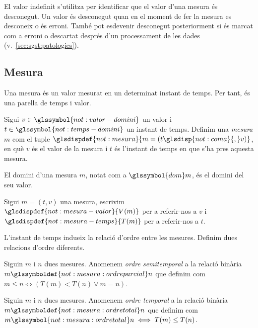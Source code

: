 El valor indefinit s'utilitza per identificar que el valor d'una
mesura és desconegut. Un valor és desconegut quan en el moment de fer
la mesura es desconeix o és erroni. També pot esdevenir desconegut
posteriorment si és marcat com a erroni o descartat després d'un
processament de les dades (v.~\autoref{sec:sgst:patologies}).





\subsection{Mesura}\label{sec:model:mesura} 

Una mesura és un valor mesurat en un determinat instant de temps. Per tant, 
és una parella de temps i valor.

\begin{definition}[Mesura]
  \label{def:model:mesura}
  Sigui $v\in\glssymbol{not:valor-domini}$ un valor i
  $t\in\glssymbol{not:temps-domini}$ un instant de temps. Definim una
  \emph{mesura} $m$ com el tuple
  $\glsdispdef{not:mesura}{m=(t\glsdisp{not:coma}{,}v)}$, en què $v$
  és el valor de la mesura i $t$ és l'instant de temps en que s'ha
  pres aquesta mesura.

  El domini d'una mesura $m$, notat com a
  $\glssymbol{dom}m$, és el domini del seu valor.
\end{definition}


Sigui $m=(t,v)$ una mesura, escrivim
$\glsdispdef{not:mesura-valor}{V(m)}$ per a referir-nos a $v$ i
$\glsdispdef{not:mesura-temps}{T(m)}$ per a referir-nos a $t$.


L'instant de temps indueix la relació d'ordre
entre les mesures. Definim dues relacions d'ordre diferents.

\begin{definition}
  Siguin $m$ i $n$ dues mesures. Anomenem \emph{ordre semitemporal} a
  la relació binària $m\glssymboldef{not:mesura:ordreparcial} n$ que
  definim com $m\leq n \iff (T(m) < T(n) \vee m=n)$.
\end{definition}


\begin{definition}
  \label{def:model:mesura-relacio-ordre}
  Siguin $m$ i $n$ dues mesures. Anomenem \emph{ordre temporal} a la
  relació binària $m\glssymboldef{not:mesura:ordretotal} n$ que
  definim com $m\glssymbol{not:mesura:ordretotal} n \iff T(m) \leq
  T(n) $.
\end{definition}



